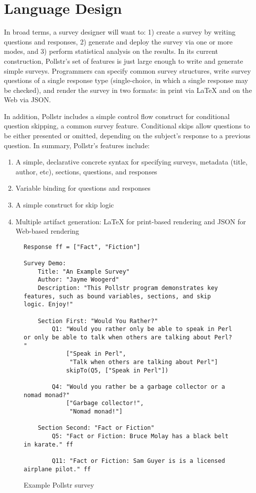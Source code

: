 \documentclass[pldi]{sigplanconf-pldi15}
\begin{document}
\section{Language Design}\label{sec:design}

In broad terms, a survey designer will want to: 1) create a survey by 
writing questions and responses, 2) generate and deploy the survey via one or 
more modes, and 3) perform statistical analysis on the results. In its current 
construction, Pollstr's set of features is just large enough to write and 
generate simple surveys. Programmers can specify common survey structures, 
write survey questions of a single response type (single-choice, in which a single 
response may be checked), and render the survey in two formats: in print via 
LaTeX and on the Web via JSON.

In addition, Pollstr includes a simple control flow construct for conditional 
question skipping, a common survey feature. Conditional skips allow questions
to be either presented or omitted, depending on the subject's response to a previous
question. In summary, Pollstr's features include:

\begin{enumerate}
\item A simple, declarative concrete syntax for specifying surveys, metadata 
(title, author, etc), sections, questions, and responses
\item Variable binding for questions and responses 
\item A simple construct for skip logic
\item Multiple artifact generation: LaTeX for print-based rendering and JSON 
for Web-based rendering
\end{enumerate}

\begin{figure}
\begin{lstlisting}
Response ff = ["Fact", "Fiction"]

Survey Demo:
    Title: "An Example Survey"
    Author: "Jayme Woogerd"
    Description: "This Pollstr program demonstrates key features, such as bound variables, sections, and skip logic. Enjoy!"

    Section First: "Would You Rather?"
        Q1: "Would you rather only be able to speak in Perl or only be able to talk when others are talking about Perl? "
            ["Speak in Perl",
             "Talk when others are talking about Perl"]
            skipTo(Q5, ["Speak in Perl"])

        Q4: "Would you rather be a garbage collector or a nomad monad?"
            ["Garbage collector!",
             "Nomad monad!"]

    Section Second: "Fact or Fiction"
        Q5: "Fact or Fiction: Bruce Molay has a black belt in karate." ff

        Q11: "Fact or Fiction: Sam Guyer is is a licensed airplane pilot." ff
\end{lstlisting}
  \caption{Example Pollstr survey}
  \label{fig:code}
  \end{figure}
\end{document}
